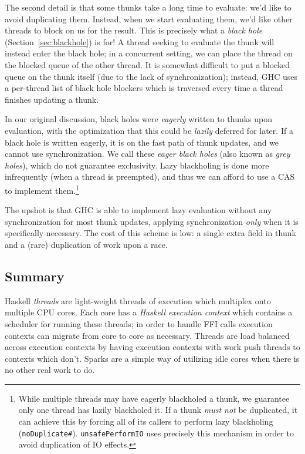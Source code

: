 The second detail is that some thunks take a long time to evaluate: we'd
like to avoid duplicating them.  Instead, when we start evaluating them,
we'd like other threads to block on us for the result.  This is
precisely what a \emph{black hole} (Section~\ref{sec:blackhole}) is for!
A thread seeking to evaluate the thunk will instead enter the black
hole; in a concurrent setting, we can place the thread on the blocked
queue of the other thread.  It is somewhat difficult to put a blocked
queue on the thunk itself (due to the lack of synchronization); instead,
GHC uses a per-thread list of black hole blockers which is traversed
every time a thread finishes updating a thunk.

In our original discussion, black holes were \emph{eagerly} written to
thunks upon evaluation, with the optimization that this could be
\emph{lazily} deferred for later.  If a black hole is written eagerly,
it is on the fast path of thunk updates, and we cannot use
synchronization.  We call these \emph{eager black holes} (also known as
\emph{grey holes}), which do not guarantee exclusivity.  Lazy blackholing is done more infrequently (when a thread is preempted), and thus
we can afford to use a CAS to implement them.\footnote{While multiple
    threads may have eagerly blackholed a thunk, we guarantee only one
    thread has lazily blackholed it.  If a thunk \emph{must not} be
duplicated, it can achieve this by forcing all of its callers to perform
lazy blackholing
(\texttt{noDuplicate\#}).  \texttt{unsafePerformIO} uses precisely
this mechanism in order to avoid duplication of IO effects.}

The upshot is that GHC is able to implement lazy evaluation without any
synchronization for most thunk updates, applying synchronization
\emph{only} when it is specifically necessary. The cost of this scheme
is low: a single extra field in thunk and a (rare) duplication of work
upon a race.

\subsection{Summary}

Haskell \emph{threads} are light-weight threads of execution which
multiplex onto multiple CPU cores.  Each core has a \emph{Haskell
execution context} which contains a scheduler for running these threads;
in order to handle FFI calls execution contexts can migrate from core to
core as necessary.  Threads are load balanced across execution contexts
by having execution contexts with work push threads to contexts which
don't.  Sparks are a simple way of utilizing idle cores when there is no
other real work to do.

